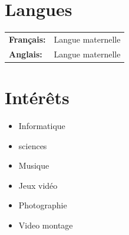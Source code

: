 \documentclass[a4paper,10pt]{article}
\begin{document}
\vspace{5mm}

\section{Langues}
\begin{tabular}{ll}
    \textbf{Français:} & Langue maternelle \\
    \textbf{Anglais:} & Langue maternelle
\end{tabular}

\section{Intérêts}
\begin{itemize}[label=\textbullet, font=\color{maincolor}\large]
    \item Informatique
    \item sciences
    \item Musique
    \item Jeux vidéo
    \item Photographie
    \item Video montage
\end{itemize}
\end{document}
